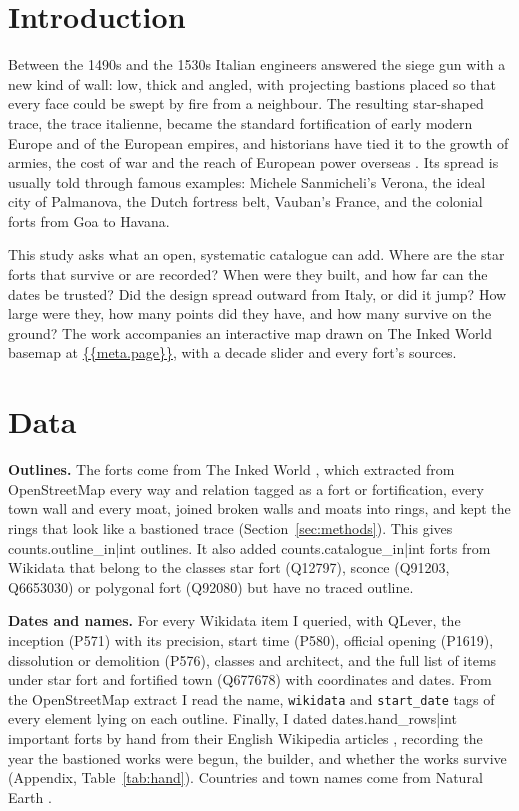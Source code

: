 \documentclass[11pt,a4paper]{article}
\begin{document}
\section{Introduction}
Between the 1490s and the 1530s Italian engineers answered the siege gun with a new kind of wall: low, thick and angled, with projecting bastions placed so that every face could be swept by fire from a neighbour. The resulting star-shaped trace, the trace italienne, became the standard fortification of early modern Europe and of the European empires, and historians have tied it to the growth of armies, the cost of war and the reach of European power overseas \citep{parker,duffy}. Its spread is usually told through famous examples: Michele Sanmicheli's Verona, the ideal city of Palmanova, the Dutch fortress belt, Vauban's France, and the colonial forts from Goa to Havana.

This study asks what an open, systematic catalogue can add. Where are the star forts that survive or are recorded? When were they built, and how far can the dates be trusted? Did the design spread outward from Italy, or did it jump? How large were they, how many points did they have, and how many survive on the ground? The work accompanies an interactive map drawn on The Inked World basemap \citep{inkmap} at \url{{{meta.page}}}, with a decade slider and every fort's sources.

\section{Data}
\textbf{Outlines.} The forts come from The Inked World \citep{inkmap}, which extracted from OpenStreetMap \citep{osm} every way and relation tagged as a fort or fortification, every town wall and every moat, joined broken walls and moats into rings, and kept the rings that look like a bastioned trace (Section~\ref{sec:methods}). This gives {{counts.outline_in|int}} outlines. It also added {{counts.catalogue_in|int}} forts from Wikidata \citep{wikidata} that belong to the classes star fort (Q12797), sconce (Q91203, Q6653030) or polygonal fort (Q92080) but have no traced outline.

\textbf{Dates and names.} For every Wikidata item I queried, with QLever, the inception (P571) with its precision, start time (P580), official opening (P1619), dissolution or demolition (P576), classes and architect, and the full list of items under star fort and fortified town (Q677678) with coordinates and dates. From the OpenStreetMap extract I read the name, \texttt{wikidata} and \texttt{start\_date} tags of every element lying on each outline. Finally, I dated {{dates.hand_rows|int}} important forts by hand from their English Wikipedia articles \citep{wikipedia}, recording the year the bastioned works were begun, the builder, and whether the works survive (Appendix, Table~\ref{tab:hand}). Countries and town names come from Natural Earth \citep{ne}.
\end{document}
